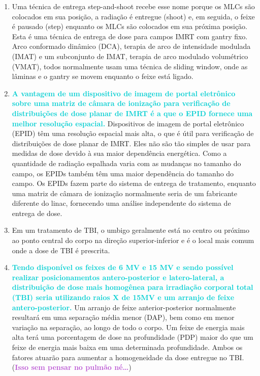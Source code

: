 \documentclass[11pt,a4paper]{article}
\begin{document}
\begin{enumerate}
        \item Uma técnica de entrega step-and-shoot recebe esse nome porque os MLCs são colocados em sua posição, a radiação é entregue (shoot) e, em seguida, o feixe é pausado (step) enquanto os MLCs são colocados em sua próxima posição. Esta é uma técnica de entrega de dose para campos IMRT com gantry fixo. Arco conformado dinâmico (DCA), terapia de arco de intensidade modulada (IMAT) e um subconjunto de IMAT, terapia de arco modulado volumétrico (VMAT), todos normalmente usam uma técnica de  sliding window, onde as lâminas e o gantry se movem enquanto o feixe está ligado.

        \item \textcolor{DarkTurquoise}{\textbf{A vantagem de um dispositivo de imagem de portal eletrônico sobre uma matriz de câmara de ionização para verificação de distribuições de dose planar de IMRT é a que o EPID fornece uma melhor resolução espacial.}} Dispositivos de imagem de portal eletrônico (EPID) têm uma resolução espacial mais alta, o que é útil para verificação de distribuições de dose planar de IMRT. Eles não são tão simples de usar para medidas de dose devido à sua maior dependência energética. Como a quantidade de radiação espalhada varia com as mudanças no tamanho do campo, os EPIDs também têm uma maior dependência do tamanho do campo. Os EPIDs fazem parte do sistema de entrega de tratamento, enquanto uma matriz de câmara de ionização normalmente seria de um fabricante diferente do linac, fornecendo uma análise independente do sistema de entrega de dose.

        \item Em um tratamento de TBI, o umbigo geralmente está no centro ou próximo ao ponto central do corpo na direção superior-inferior e é o local mais comum onde a dose de TBI é prescrita.
            
        \item \textcolor{DarkTurquoise}{\textbf{Tendo disponível os feixes de 6 MV e 15 MV e sendo possível realizar posicionamentos antero-posterior e latero-lateral, a distribuição de dose mais homogênea para irradiação corporal total (TBI) seria utilizando raios X de 15MV e um arranjo de feixe antero-posterior.}} Um arranjo de feixe anterior-posterior normalmente resultará em uma separação média menor (DAP), bem como em menor variação na separação, ao longo de todo o corpo. Um feixe de energia mais alta terá uma porcentagem de dose na profundidade (PDP) maior do que um feixe de energia mais baixa em uma determinada profundidade. Ambos os fatores atuarão para aumentar a homogeneidade da dose entregue no TBI. (\textcolor{MediumOrchid}{\textbf{Isso sem pensar no pulmão né\dots}})


\end{enumerate}
\end{document}
